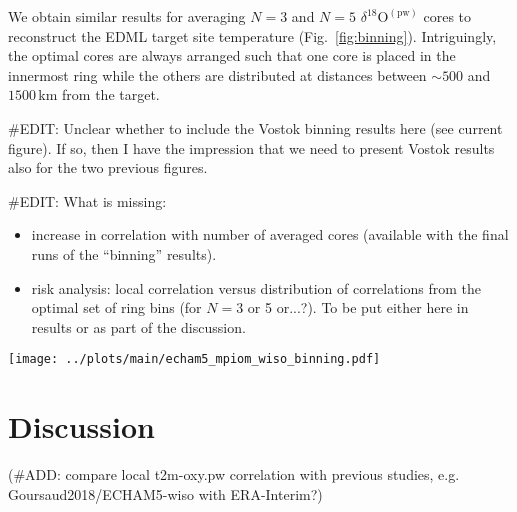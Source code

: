 \documentclass[cp, manuscript]{copernicus}
\begin{document}
We obtain similar results for averaging $N=3$ and $N=5$
$\delta^{18}\mathrm{O}^{\mathrm{(pw)}}$ cores to reconstruct the EDML target
site temperature (Fig.~\ref{fig:binning}). Intriguingly, the optimal cores are
always arranged such that one core is placed in the innermost ring while the
others are distributed at distances between $\sim500$ and $1500$\,km from the
target.

\noindent
\#EDIT: Unclear whether to include the Vostok binning results here (see current
figure). If so, then I have the impression that we need to present Vostok
results also for the two previous figures.

\noindent
\#EDIT: What is missing:
\begin{itemize}
\item increase in correlation with number of averaged cores (available with the
  final runs of the ``binning'' results).
\item risk analysis: local correlation versus distribution of correlations from
  the optimal set of ring bins (for $N=3$ or 5 or...?). To be put either here in
  results or as part of the discussion.
\end{itemize}

\begin{figure*}[t]%
\centering
\texttt{[image: ../plots/main/echam5\_mpiom\_wiso\_binning.pdf]}
\caption{%
  The optimal arrangement of averaging three or five
  $\delta^{18}\mathrm{O}^{\mathrm{(pw)}}$ cores to reconstruct the target site
  temperature at EDML (\textbf{a}, \textbf{c}) and Vostok (\textbf{b},
  \textbf{d}). Displayed are the optimal five of all possible combinations of
  ring bins, i.e. those which exhibit the highest mean correlation across $1000$
  (\#EDIT: to be increased) random trials of averaging $N=3$ (\textbf{c},
  \textbf{d}) or $N=5$ (\textbf{a}, \textbf{b}) grid cells from these
  rings. \#EDIT: the figure could also be done for the average across target
  sites in the \emph{regions} DML and Vostok.}
\label{fig:binning}%
\end{figure*}%

\section{Discussion}\label{discussion}

(\#ADD: compare local t2m-oxy.pw correlation with previous studies,
e.g. Goursaud2018/ECHAM5-wiso with ERA-Interim?)

\end{document}
